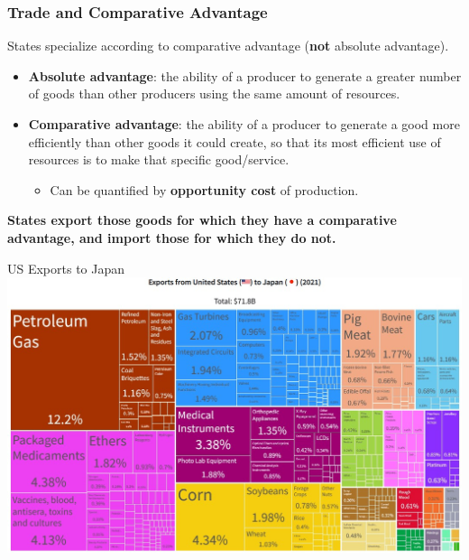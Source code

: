 \documentclass[handout]{beamer}
\begin{document}
\begin{frame} 
	\frametitle{\LARGE{Trade and Comparative Advantage}}
	States specialize according to comparative advantage (\textbf{not} absolute advantage). \pause
	\begin{itemize}

			\item \textbf{Absolute advantage}: the ability of a producer to generate a greater number of goods than other producers using the same amount of resources. \pause

			\item \textbf{Comparative advantage}: the ability of a producer to generate a good more efficiently than other goods it could create, so that its most efficient use of resources is to make that specific good/service. \pause 
			\begin{itemize} 
			    \item Can be quantified by \textbf{opportunity cost} of production. \pause
			\end{itemize}
	\end{itemize}
	\textbf{States export those goods for which they have a comparative advantage, and import those for which they do not.}
\end{frame}



\begin{frame}{\LARGE US Exports to Japan}
    \centering
\includegraphics[width=\textwidth,height=0.9\textheight,keepaspectratio]{US to Japan.JPG}
\end{frame}
\end{document}
